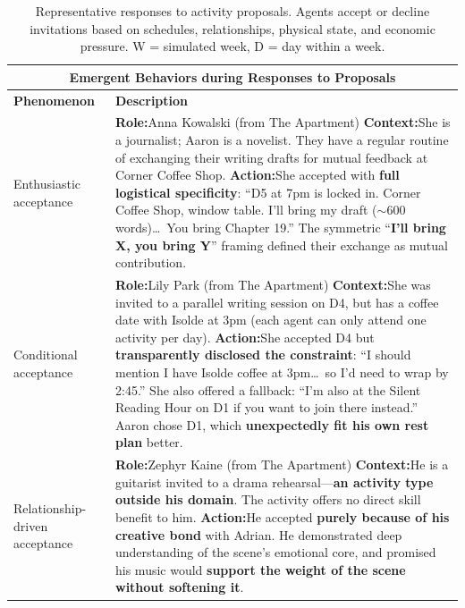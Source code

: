   \begin{table}[t]
  \centering
  \small
  \caption{Representative responses to activity proposals. Agents accept or decline invitations based on schedules, relationships, physical state, and economic pressure. W = simulated week, D = day within a week.}
  \label{tab:responses}
  \begin{tabular}{p{0.8in}p{4.3in}}
  \toprule
  \multicolumn{2}{c}{\textbf{Emergent Behaviors during Responses to Proposals}} \\
  \midrule
  \textbf{Phenomenon} & \textbf{Description} \\
  \midrule
  
  Enthusiastic \newline acceptance
  &
  \textbf{Role:}\quad Anna Kowalski \hfill (from The Apartment) \newline
  \textbf{Context:}\quad She is a journalist; Aaron is a novelist. They have a regular routine of exchanging their writing drafts for mutual feedback at Corner Coffee Shop. \newline
  \textbf{Action:}\quad She accepted with \textbf{full logistical specificity}: ``D5 at 7pm is locked in. Corner Coffee Shop, window table. I'll bring my draft ($\sim$600 words)\ldots\ You bring Chapter 19.'' The symmetric ``\textbf{I'll bring X, you bring Y}'' framing defined their exchange as mutual contribution.
  \\
  \midrule
  
  Conditional \newline acceptance
  &
  \textbf{Role:}\quad Lily Park \hfill (from The Apartment) \newline
  \textbf{Context:}\quad She was invited to a parallel writing session on D4, but has a coffee date with Isolde at 3pm (each agent can only attend one activity per day). \newline
  \textbf{Action:}\quad She accepted D4 but \textbf{transparently disclosed the constraint}: ``I should mention I have Isolde coffee at 3pm\ldots\ so I'd need to wrap by 2:45.'' She also offered a fallback: ``I'm also at the Silent Reading Hour on D1 if you want to join there instead.'' Aaron chose D1, which \textbf{unexpectedly fit his own rest plan} better.
  \\
  \midrule
  
  Relationship-\newline driven \newline acceptance
  &
  \textbf{Role:}\quad Zephyr Kaine \hfill (from The Apartment) \newline
  \textbf{Context:}\quad He is a guitarist invited to a drama rehearsal---\textbf{an activity type outside his domain}. The activity offers no direct skill benefit to him. \newline
  \textbf{Action:}\quad He accepted \textbf{purely because of his creative bond} with Adrian. He demonstrated deep understanding of the scene's emotional core, and promised his music would \textbf{support the weight of the scene without softening it}.
  \\
  \midrule
  

\end{tabular}
\end{table}
